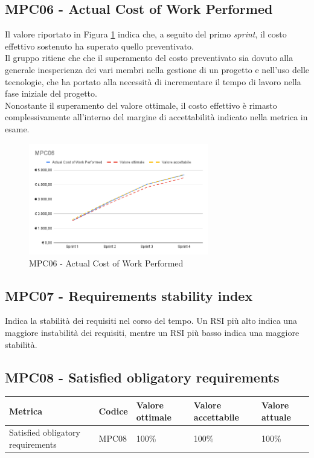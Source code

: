 \subsection{MPC06 - Actual Cost of Work Performed}
\label{s:mpc06}
Il valore riportato in Figura \ref{fig:mpc06} indica che, a seguito del primo \textit{sprint}, il costo effettivo sostenuto ha superato quello preventivato.\\
Il gruppo ritiene che che il superamento del costo preventivato sia dovuto alla generale inesperienza dei vari membri nella gestione di un progetto e nell'uso delle tecnologie, che ha portato alla necessità di incrementare il tempo di lavoro nella fase iniziale del progetto.\\
Nonostante il superamento del valore ottimale, il costo effettivo è rimasto complessivamente all'interno del margine di accettabilità indicato nella metrica in esame.

\begin{figure}[htbp]
    \centering
    \includegraphics[width=0.7\textwidth]{img/MPC06.png}
    \caption{MPC06 - Actual Cost of Work Performed}
    \label{fig:mpc06}
\end{figure}


\subsection{MPC07 - Requirements stability index}
\label{s:mpc07}
Indica la stabilità dei requisiti nel corso del tempo.
Un RSI più alto indica una maggiore instabilità dei requisiti, mentre un RSI più basso indica una maggiore stabilità.



\subsection{MPC08 - Satisfied obligatory requirements}
\label{s:mpc08}
\begin{table}[H]
    \centering
    \begin{tabularx}{\textwidth}{p{5.5cm}|X|l|l|l}
        \hline
		\textbf{Metrica} & \textbf{Codice} & \textbf{Valore ottimale} & \textbf{Valore accettabile}  & \textbf{Valore attuale} \\
        \hline
        Satisfied obligatory requirements  & MPC08 & 100\% & 100\% & 100\% \\
    \end{tabularx}
\end{table}


